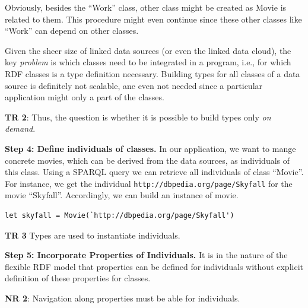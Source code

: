 \documentclass{llncs} %
\newcommand{\nr}[1]{\textbf{NR #1}}
\newcommand{\tr}[1]{\textbf{TR #1}}
\begin{document}
Obviously, besides the ``Work'' class, other class might be created as Movie is related to them. This procedure might even continue since
these other classes like ``Work'' can depend on other classes.

Given the sheer size of linked data sources (or even the linked data cloud), the key \emph{problem} is which classes need to be 
integrated in a program, i.e., for which RDF classes is a type definition necessary. Building types for all classes of a
data source is definitely not scalable, ane even not needed since a particular application 
might only a part of the classes.

\tr{2}: Thus, the question is whether it is possible to build types only \emph{on demand}.

\vspace{0.8em}
\noindent
\textbf{Step 4: Define individuals of classes.}
In our application, we want to mange concrete movies, which can be derived from the data sources,
as individuals of this class. Using a SPARQL query we can retrieve all individuals of class ``Movie''.
For instance, we get the individual \texttt{http://dbpedia.org/page/Skyfall} for the movie ``Skyfall''.
Accordingly, we can build an instance of movie.

\begin{lstlisting}[style=code, caption={Individual of  ``Movie'' }, label={lst:skyfall}]
  let skyfall = Movie(`http://dbpedia.org/page/Skyfall')
\end{lstlisting}

\tr{3} Types are used to instantiate individuals. 

\vspace{0.8em}
\noindent
\textbf{Step 5: Incorporate Properties of Individuals.}
It is in the nature of the flexible RDF model that properties can be defined for individuals 
without explicit definition of these properties for classes.

\nr{2}: Navigation along properties must be able for individuals.

\end{document}
